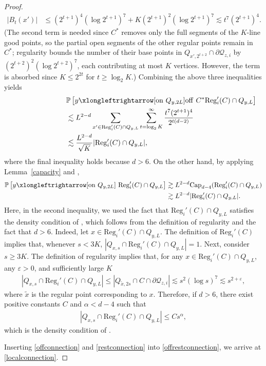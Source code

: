 \documentclass[11pt]{article}
\theoremstyle{definition}
\theoremstyle{remark}
\newcommand{\bP}{\mathbb{P}}
\numberwithin{equation}{section}
\theoremstyle{plain}
\theoremstyle{definition}
\theoremstyle{remark}
\theoremstyle{plain}
\begin{document}
\begin{proof}
\begin{align*}
       |B_t(x')|&\le  (2^{t+1})^4(\log2^{t+1})^7+K(2^{t+1})^2(\log2^{t+1})^7
       \lesssim t^7(2^{t+1})^4.
    \end{align*}
(The second term is needed since $C^*$ removes only the full segments of the $K$-line good points, so the partial open segments of the other regular points remain in $C^*$; regularity bounds the number of their base points in $Q_{x',2^{t+2}}\cap\partial\mathcal Q_{z,i}$ by $(2^{t+2})^2(\log 2^{t+2})^7$, each contributing at most $K$ vertices. However, the term is absorbed since $K\le 2^{2t}$ for $t\ge\log_2K$.) Combining the above three inequalities yields
\begin{align}
    \lefteqn{\bP\left[y \xlongleftrightarrow[\mathrm{on}~Q_{y,2L}]{\mathrm{off}~C^*}\mathrm{Reg}_i'(C)\cap Q_{y,L}\right]}\nonumber\\
    &\lesssim L^{2-d}\sum_{x' \in \mathrm{Reg}_i'(C)\cap Q_{y,L}}\sum_{t=\log_2K}^{\infty}
        \frac{t^7(2^{t+1})^4}{2^{t(d-2)}}\nonumber\\
        &\lesssim \frac{L^{2-d}}{\sqrt{K}}|\mathrm{Reg}_i'(C)\cap Q_{y,L}|,\label{offconnection}
\end{align}
where the final inequality holds because $d>6$. On the other hand, by applying Lemma~\ref{capacity} and \cite[Claim~6.1]{ASS},
\begin{align}
    \bP\left[y \xlongleftrightarrow[\mathrm{on}~Q_{y,2L}]{~} \mathrm{Reg}_i'(C)\cap Q_{y,L}\right]&\gtrsim L^{2-d}\mathrm{Cap}_{d-4}(\mathrm{Reg}_i'(C)\cap Q_{y,L})\nonumber\\
    &\gtrsim L^{2-d}|\mathrm{Reg}_i'(C)\cap Q_{y,L}|. \label{restconnection}
\end{align}
Here, in the second inequality, we used the fact that $\mathrm{Reg}_i'(C)\cap Q_{y,L}$ satisfies the density condition of  \cite[Claim~6.1]{ASS}, which follows from the definition of regularity and the fact that $d>6$.
Indeed, let $x \in \mathrm{Reg}_i'(C)\cap Q_{y,L}$. The definition of  $\mathrm{Reg}_i'(C)$ implies that, whenever $s<3K$, $|Q_{x,s}\cap \mathrm{Reg}_i'(C)\cap Q_{y,L}|=1$. Next, consider $s\ge 3K$. The definition of regularity implies that, for any $x \in \mathrm{Reg}_i'(C)\cap Q_{y,L}$, any $\varepsilon>0$, and sufficiently large $K$
\begin{align*}
    |Q_{x,s} \cap \mathrm{Reg}_i'(C)\cap Q_{y,L}|\le \left| Q_{\tilde{x},2s}\cap C\cap \partial \mathcal Q_{z,i}\right|\lesssim s^2(\log s)^7 \lesssim s^{2+\varepsilon},
\end{align*}
where $\tilde{x}$ is the regular point  corresponding to $x$. Therefore, if $d>6$, there exist positive constants $C$ and $\alpha <d-4$ such that
\begin{align*}
 |Q_{x,s} \cap \mathrm{Reg}_i'(C)\cap Q_{y,L}|\le Cs^{\alpha},
\end{align*}
which is the density condition of \cite[Claim~6.1]{ASS}.

Inserting \eqref{offconnection} and \eqref{restconnection} into \eqref{offrestconnection}, we arrive at \eqref{localconnection}.
\end{proof}
\end{document}
